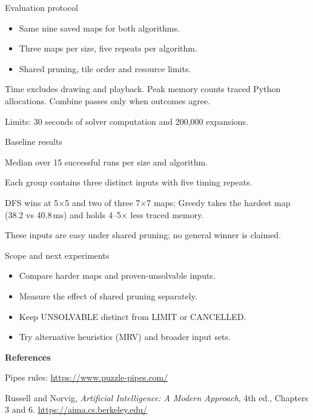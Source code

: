 \begin{frame}{Evaluation protocol}
\begin{itemize}
\item Same nine saved maps for both algorithms.
\item Three maps per size, five repeats per algorithm.
\item Shared pruning, tile order and resource limits.
\end{itemize}
\vspace{4mm}
\vspace{4mm}\par
\small Time excludes drawing and playback. Peak memory counts traced Python
allocations. Combine passes only when outcomes agree.\par\vspace{3mm}
Limits: 30 seconds of solver computation and 200,000 expansions.
\end{frame}

\begin{frame}{Baseline results}

\vspace{3mm}
\small Median over 15 successful runs per size and algorithm.\par
Each group contains three distinct inputs with five timing repeats.\par\vspace{3mm}
DFS wins at 5$\times$5 and two of three 7$\times$7 maps; Greedy takes the hardest
map (38.2 vs 40.8\,ms) and holds 4--5$\times$ less traced memory.\par
These inputs are easy under shared pruning; no general winner is claimed.
\end{frame}

\begin{frame}{Scope and next experiments}
\begin{itemize}
\item Compare harder maps and proven-unsolvable inputs.
\item Measure the effect of shared pruning separately.
\item Keep UNSOLVABLE distinct from LIMIT or CANCELLED.
\item Try alternative heuristics (MRV) and broader input sets.
\end{itemize}
\vspace{5mm}
\small\textbf{References}\par\vspace{2mm}
Pipes rules: \url{https://www.puzzle-pipes.com/}\par
Russell and Norvig, \emph{Artificial Intelligence: A Modern Approach},
4th ed., Chapters 3 and 6. \url{https://aima.cs.berkeley.edu/}
\end{frame}
